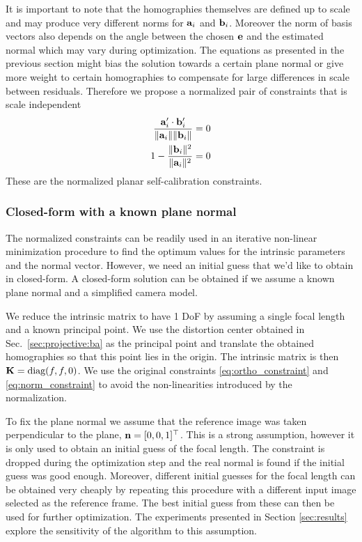 \documentclass[10pt,twocolumn,letterpaper]{article}
\begin{document}
It is important to note that the homographies themselves are defined up to scale and may produce very different norms for $\mathbf{a}_i$ and $\mathbf{b}_i$. Moreover the norm of basis vectors also depends on the angle between the chosen $\mathbf{e}$ and the estimated normal which may vary during optimization. The equations as presented in the previous section might bias the solution towards a certain plane normal or give more weight to certain homographies to compensate for large differences in scale between residuals. Therefore we propose a normalized pair of constraints that is scale independent 
\begin{align}
\frac{\mathbf{a}_i' \cdot \mathbf{b}_i'}{\lVert\mathbf{a}_i\rVert \lVert\mathbf{b}_i\rVert} = 0 \label{eq:ortho_constraint_normalized}\\
1 - \frac{\lVert\mathbf{b}_i\rVert^2}{\lVert\mathbf{a}_i\rVert^2} = 0 \label{eq:norm_constraint_normalized}
\end{align}
These are the normalized planar self-calibration constraints.

\subsubsection{Closed-form with a known plane normal}
\label{sec:calib:closed}

The normalized constraints can be readily used in an iterative non-linear minimization procedure to find the optimum values for the intrinsic parameters and the normal vector. However, we need an initial guess that we'd like to obtain in closed-form. A closed-form solution can be obtained if we assume a known plane normal and a simplified camera model. 

We reduce the intrinsic matrix to have 1 DoF by assuming a single focal length and a known principal point. We use the distortion center obtained in Sec.~\ref{sec:projective:ba} as the principal point and translate the obtained homographies so that this point lies in the origin. The intrinsic matrix is then $\mathbf{K}=\text{diag}(f, f, 0)$. We use the original constraints \eqref{eq:ortho_constraint} and \eqref{eq:norm_constraint} to avoid the non-linearities introduced by the normalization.

To fix the plane normal we assume that the reference image was taken perpendicular to the plane, \ie $\mathbf{n}=[0,0,1]^\top$. This is a strong assumption, however it is only used to obtain an initial guess of the focal length. The constraint is dropped during the optimization step and the real normal is found if the initial guess was good enough. Moreover, different initial guesses for the focal length can be obtained very cheaply by repeating this procedure with a different input image selected as the reference frame. The best initial guess from these can then be used for further optimization. The experiments presented in Section \ref{sec:results} explore the sensitivity of the algorithm to this assumption.
\end{document}
